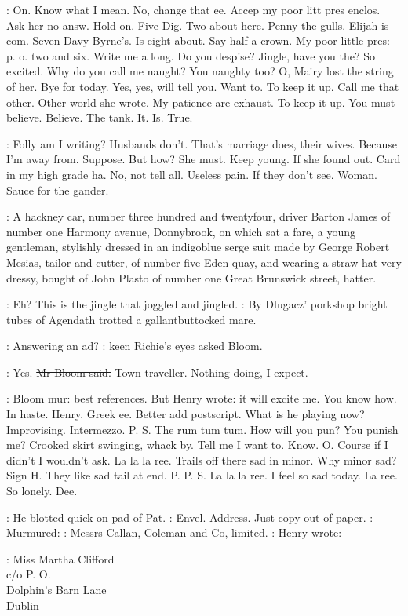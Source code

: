 \BloomInt:
On.
Know what I mean.
No,
change that ee.
Accep my poor litt pres
enclos.
Ask her no answ.
Hold on.
Five Dig.
Two about here.
Penny the
gulls.
Elijah is com.
Seven Davy Byrne's.
Is eight about.
Say half a
crown.
My poor little pres:
p.
o.
two and six.
Write me a long.
Do you
despise?
Jingle,
have you the?
So excited.
Why do you call me naught?
You naughty too?
O,
Mairy lost the string of her.
Bye for today.
Yes,
yes,
will tell you.
Want to.
To keep it up.
Call me that other.
Other world she
wrote.
My patience are exhaust.
To keep it up.
You must believe.
Believe.
The tank.
It.
Is.
True.

\BloomInt:
Folly am I writing?
Husbands don't.
That's marriage does,
their
wives.
Because I'm away from.
Suppose.
But how?
She must.
Keep young.
If she found out.
Card in my high grade ha.
No,
not tell all.
Useless
pain.
If they don't see.
Woman.
Sauce for the gander.

:
A hackney car,
number three hundred and twentyfour,
driver Barton James of
number one Harmony avenue,
Donnybrook,
on which sat a fare,
a young gentleman,
stylishly dressed in an indigoblue serge suit made by
George Robert Mesias,
tailor and cutter,
of number five Eden quay,
and
wearing a straw hat very dressy,
bought of John Plasto of number one
Great Brunswick street,
hatter.

\BloomInt:
Eh?
This is the jingle that joggled and jingled.
:
By Dlugacz' porkshop bright tubes of Agendath trotted a
gallantbuttocked mare.

\goulding:
Answering an ad?
:
keen Richie's eyes asked Bloom.

\Bloom:
Yes.
\sout{Mr Bloom said.}
Town traveller.
Nothing doing,
I expect.

\BloomInt:
Bloom mur:
best references.
But Henry wrote:
it will excite me.
You
know how.
In haste.
Henry.
Greek ee.
Better add postscript.
What is he
playing now?
Improvising.
Intermezzo.
P.
S.
The rum tum tum.
How will
you pun?
You punish me?
Crooked skirt swinging,
whack by.
Tell me I want
to.
Know.
O.
Course if I didn't I wouldn't ask.
La la la ree.
Trails off
there sad in minor.
Why minor sad?
Sign H.
They like sad tail at end.
P.
P.
S.
La la la ree.
I feel so sad today.
La ree.
So lonely.
Dee.

:
He blotted quick on pad of Pat.
\BloomInt:
Envel.
Address.
Just copy out of paper.
:
Murmured:
\BloomInt:
Messrs Callan,
Coleman and Co,
limited.
:
Henry wrote:

:
        Miss Martha Clifford\\
            c/o P.
O.\\
                Dolphin's Barn Lane\\
                     Dublin

